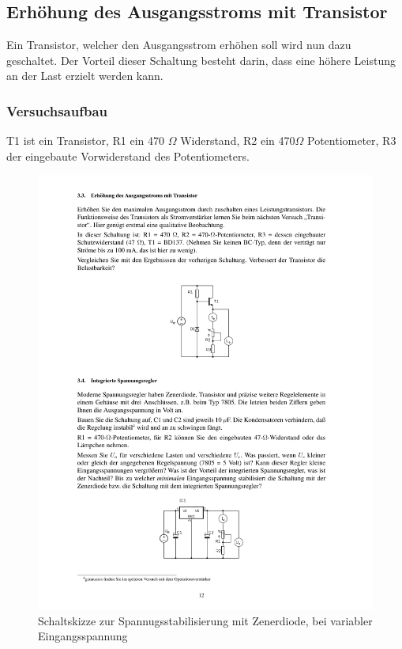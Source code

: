 \documentclass[12pt,a4paper]{article}
\begin{document}
\subsection{Erhöhung des Ausgangsstroms mit Transistor}
Ein Transistor, welcher den Ausgangsstrom erhöhen soll wird nun dazu geschaltet. Der Vorteil dieser Schaltung besteht darin, dass eine höhere Leistung an der Last erzielt werden kann. 
\subsubsection{Versuchsaufbau}

T1 ist ein Transistor, R1 ein 470 $\Omega$ Widerstand, R2 ein 470$\Omega$ Potentiometer, R3 der eingebaute Vorwiderstand des Potentiometers.

\begin{figure}[H] 
  \centering
    \includegraphics[trim = 10mm 160mm 10mm 70mm, clip, scale = 1]{ep2_14[Page12].pdf}
  	\caption[Schaltskizze zur Spannugsstabilisierung mit Zenerdiode, bei variabler Eingangsspannung]{Schaltskizze zur Spannugsstabilisierung mit Zenerdiode, bei variabler Eingangsspannung\footnotemark}
  \label{fig:2_10}
\end{figure}
\end{document}
